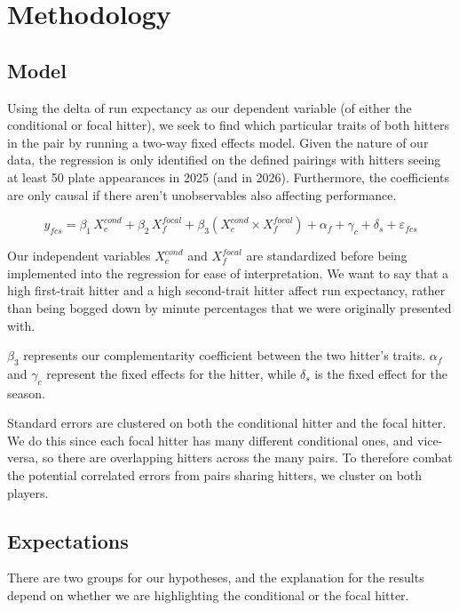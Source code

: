 \documentclass{article}
\begin{document}
\section{Methodology}

\subsection{Model}

Using the delta of run expectancy as our dependent variable (of either the conditional or focal hitter), we seek to find which particular traits of both hitters in the pair by running a two-way fixed effects model. Given the nature of our data, the regression is only identified on the defined pairings with hitters seeing at least 50 plate appearances in 2025 (and in 2026). Furthermore, the coefficients are only causal if there aren't unobservables also affecting performance.

$$y_{fcs} = \beta_1 \, X^{cond}_{c} + \beta_2 \, X^{focal}_{f} + \beta_3 \left( X^{cond}_{c} \times X^{focal}_{f} \right) + \alpha_f + \gamma_c + \delta_s + \varepsilon_{fcs}$$

Our independent variables $X^{cond}_{c}$ and $X^{focal}_{f}$ are standardized before being implemented into the regression for ease of interpretation. We want to say that a high first-trait hitter and a high second-trait hitter affect run expectancy, rather than being bogged down by minute percentages that we were originally presented with.

$\beta_3$ represents our complementarity coefficient between the two hitter's traits.  $\alpha_f$ and $\gamma_c$ represent the fixed effects for the hitter, while $\delta_s$ is the fixed effect for the season.

Standard errors are clustered on both the conditional hitter and the focal hitter. We do this since each focal hitter has many different conditional ones, and vice-versa, so there are overlapping hitters across the many pairs. To therefore combat the potential correlated errors from pairs sharing hitters, we cluster on both players.

\subsection{Expectations}

There are two groups for our hypotheses, and the explanation for the results depend on whether we are highlighting the conditional or the focal hitter.
\end{document}

